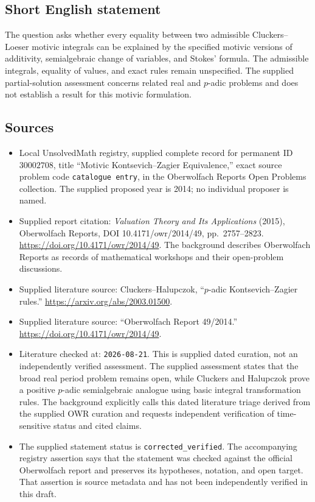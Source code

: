 \documentclass[11pt]{article}
\begin{document}
\subsection{Short English statement}
The question asks whether every equality between two admissible Cluckers--Loeser motivic integrals can be explained by the specified motivic versions of additivity, semialgebraic change of variables, and Stokes' formula. The admissible integrals, equality of values, and exact rules remain unspecified. The supplied partial-solution assessment concerns related real and \(p\)-adic problems and does not establish a result for this motivic formulation.
\subsection{Sources}
\begin{itemize}
\item Local UnsolvedMath registry, supplied complete record for permanent ID \(30002708\), title ``Motivic Kontsevich--Zagier Equivalence,'' exact source problem code \texttt{catalogue entry}, in the Oberwolfach Reports Open Problems collection. The supplied proposed year is 2014; no individual proposer is named.
\item Supplied report citation: \emph{Valuation Theory and Its Applications} (2015), Oberwolfach Reports, DOI 10.4171/owr/2014/49, pp.~2757--2823. \url{https://doi.org/10.4171/owr/2014/49}. The background describes Oberwolfach Reports as records of mathematical workshops and their open-problem discussions.
\item Supplied literature source: Cluckers--Halupczok, ``\(p\)-adic Kontsevich--Zagier rules.'' \url{https://arxiv.org/abs/2003.01500}.
\item Supplied literature source: ``Oberwolfach Report 49/2014.'' \url{https://doi.org/10.4171/owr/2014/49}.
\item Literature checked at: \texttt{2026-08-21}. This is supplied dated curation, not an independently verified assessment. The supplied assessment states that the broad real period problem remains open, while Cluckers and Halupczok prove a positive \(p\)-adic semialgebraic analogue using basic integral transformation rules. The background explicitly calls this dated literature triage derived from the supplied OWR curation and requests independent verification of time-sensitive status and cited claims.
\item The supplied statement status is \texttt{corrected\_verified}. The accompanying registry assertion says that the statement was checked against the official Oberwolfach report and preserves its hypotheses, notation, and open target. That assertion is source metadata and has not been independently verified in this draft.
\end{itemize}
\end{document}
